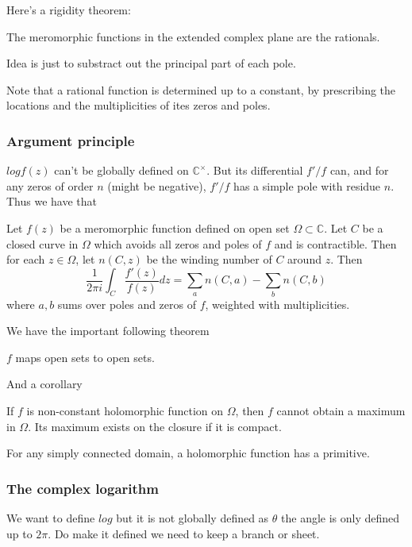 \documentclass[main.tex]{subfiles}
\begin{document}
Here's a rigidity theorem:
\begin{theorem}
The meromorphic functions in the extended complex plane are the rationals. 
\end{theorem}
Idea is just to substract out the principal part of each pole.

Note that a rational function is determined up to a constant, by prescribing the locations and the multiplicities of ites zeros and poles.

\subsubsection{Argument principle}
$log f(z)$ can't be globally defined on $\mathbb{C}^\times$. But its differential $f'/f$ can, and for any zeros of order $n$ (might be negative), $f'/f$ has a simple pole with residue $n$. Thus we have that

\begin{theorem}
Let $f(z)$ be a meromorphic function defined on open set $\Omega \subset \mathbb{C}$. Let $C$ be a closed curve in $\Omega$ which avoids all zeros and poles of $f$ and is contractible. Then for each $z \in \Omega$, let $n(C,z)$ be the winding number of $C$ around $z$. Then 
$$
\frac{1}{2\pi i} \int_C \frac{f'(z)}{f(z)} dz = \sum_a n(C,a) - \sum_b n(C,b)
$$
where $a, b$ sums over poles and zeros of $f$, weighted with multiplicities.
\end{theorem}

We have the important following theorem 
\begin{theorem}
$f$ maps open sets to open sets.
\end{theorem}

And a corollary 
\begin{corollary}
If $f$ is non-constant holomorphic function on $\Omega$, then $f$ cannot obtain a maximum in $\Omega$. Its maximum exists on the closure if it is compact.
\end{corollary}

For any simply connected domain, a holomorphic function has a primitive. 

\subsubsection{The complex logarithm}
We want to define $log$ but it is not globally defined as $\theta$ the angle is only defined up to $2\pi$. Do make it defined we need to keep a branch or sheet.
\end{document}
